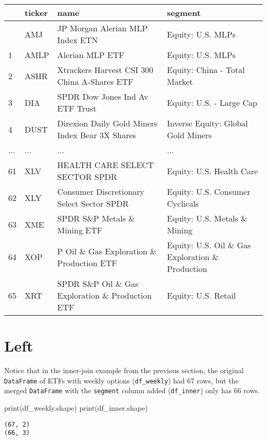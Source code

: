 \documentclass[
  letterpaper,
  DIV=11,
  numbers=noendperiod]{scrreprt}
\newenvironment{Shaded}{\begin{snugshade}}{\end{snugshade}}
\newcommand{\BuiltInTok}[1]{\textcolor[rgb]{0.00,0.23,0.31}{#1}}
\newcommand{\NormalTok}[1]{\textcolor[rgb]{0.00,0.23,0.31}{#1}}
\begin{document}
\begin{longtable}[]{@{}llll@{}}
\toprule\noalign{}
& ticker & name & segment \\
\midrule\noalign{}
\endhead
\bottomrule\noalign{}
\endlastfoot
0 & AMJ & JP Morgan Alerian MLP Index ETN & Equity: U.S. MLPs \\
1 & AMLP & Alerian MLP ETF & Equity: U.S. MLPs \\
2 & ASHR & Xtrackers Harvest CSI 300 China A-Shares ETF & Equity: China
- Total Market \\
3 & DIA & SPDR Dow Jones Ind Av ETF Trust & Equity: U.S. - Large Cap \\
4 & DUST & Direxion Daily Gold Miners Index Bear 3X Shares & Inverse
Equity: Global Gold Miners \\
... & ... & ... & ... \\
61 & XLV & HEALTH CARE SELECT SECTOR SPDR & Equity: U.S. Health Care \\
62 & XLY & Consumer Discretionary Select Sector SPDR & Equity: U.S.
Consumer Cyclicals \\
63 & XME & SPDR S\&P Metals \& Mining ETF & Equity: U.S. Metals \&
Mining \\
64 & XOP & P Oil \& Gas Exploration \& Production ETF & Equity: U.S. Oil
\& Gas Exploration \& Production \\
65 & XRT & SPDR S\&P Oil \& Gas Exploration \& Production ETF & Equity:
U.S. Retail \\
\end{longtable}

\hypertarget{left}{%
\section{Left}\label{left}}

Notice that in the inner-join example from the previous section, the
original \texttt{DataFrame} of ETFs with weekly options
(\texttt{df\_weekly}) had 67 rows, but the merged \texttt{DataFrame}
with the \texttt{segment} column added (\texttt{df\_inner}) only has 66
rows.

\begin{Shaded}
\begin{Highlighting}[]
\BuiltInTok{print}\NormalTok{(df\_weekly.shape)}
\BuiltInTok{print}\NormalTok{(df\_inner.shape)}
\end{Highlighting}
\end{Shaded}

\begin{verbatim}
(67, 2)
(66, 3)
\end{verbatim}
\end{document}
